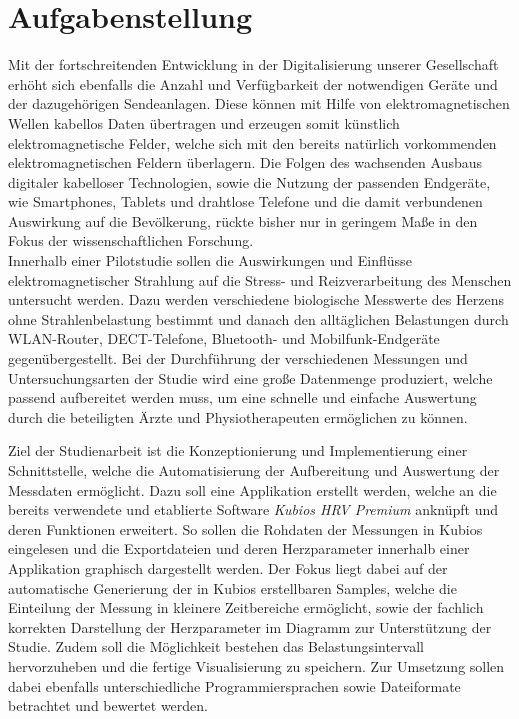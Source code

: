 
\chapter{Aufgabenstellung}

Mit der fortschreitenden Entwicklung in der Digitalisierung unserer Gesellschaft erhöht sich ebenfalls die Anzahl und Verfügbarkeit der notwendigen Geräte und der dazugehörigen Sendeanlagen. Diese können mit Hilfe von elektromagnetischen Wellen kabellos Daten übertragen und erzeugen somit künstlich elektromagnetische Felder, welche sich mit den bereits natürlich vorkommenden elektromagnetischen Feldern überlagern. Die Folgen des wachsenden Ausbaus digitaler kabelloser Technologien, sowie die Nutzung der passenden Endgeräte, wie Smartphones, Tablets und drahtlose Telefone und die damit verbundenen Auswirkung auf die Bevölkerung, rückte bisher nur in geringem Maße in den Fokus der wissenschaftlichen Forschung.\\
Innerhalb einer Pilotstudie sollen die Auswirkungen und Einflüsse elektromagnetischer Strahlung auf die Stress- und Reizverarbeitung des Menschen untersucht werden. Dazu werden verschiedene biologische Messwerte des Herzens ohne Strahlenbelastung bestimmt und danach den alltäglichen Belastungen durch WLAN-Router, DECT-Telefone, Bluetooth- und Mobilfunk-Endgeräte gegenübergestellt. Bei der Durchführung der verschiedenen Messungen und Untersuchungsarten der Studie wird eine große Datenmenge produziert, welche passend aufbereitet werden muss, um eine schnelle und einfache Auswertung durch die beteiligten Ärzte und Physiotherapeuten ermöglichen zu können.

Ziel der Studienarbeit ist die Konzeptionierung und Implementierung einer Schnittstelle, welche die Automatisierung der Aufbereitung und Auswertung der Messdaten ermöglicht. Dazu soll eine Applikation erstellt werden, welche an die bereits verwendete und etablierte Software \textit{Kubios HRV Premium} anknüpft und deren Funktionen erweitert. So sollen die Rohdaten der Messungen in Kubios eingelesen und die Exportdateien und deren Herzparameter innerhalb einer Applikation graphisch dargestellt werden. Der Fokus liegt dabei auf der automatische Generierung der in Kubios erstellbaren Samples, welche die Einteilung der Messung in kleinere Zeitbereiche ermöglicht, sowie der fachlich korrekten Darstellung der Herzparameter im Diagramm zur Unterstützung der Studie. Zudem soll die Möglichkeit bestehen das Belastungsintervall hervorzuheben und die fertige Visualisierung zu speichern. Zur Umsetzung sollen dabei ebenfalls unterschiedliche Programmiersprachen sowie Dateiformate betrachtet und bewertet werden. 